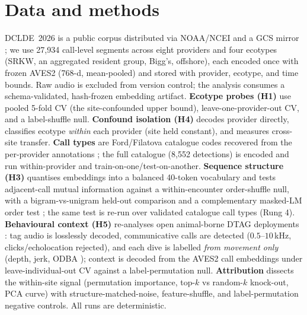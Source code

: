 \documentclass[11pt]{article}
\begin{document}
\section{Data and methods}
DCLDE~2026 is a public corpus distributed via NOAA/NCEI and a GCS mirror
\citep{palmer2025dclde,palmer2025dclde_data}; we use 27{,}934 call-level segments across
eight providers and four ecotypes (SRKW, an aggregated resident group, Bigg's, offshore),
each encoded once with frozen AVES2 (768-d, mean-pooled) and stored with provider, ecotype,
and time bounds. Raw audio is excluded from version control; the analysis consumes a
schema-validated, hash-frozen embedding artifact. \textbf{Ecotype probes (H1)} use pooled
5-fold CV (the site-confounded upper bound), leave-one-provider-out CV, and a label-shuffle
null. \textbf{Confound isolation (H4)} decodes provider directly, classifies ecotype
\emph{within} each provider (site held constant), and measures cross-site transfer.
\textbf{Call types} are Ford/Filatova catalogue codes recovered from the per-provider
annotations \citep{ford1989,filatova2015}; the full catalogue (8{,}552 detections) is
encoded and run within-provider and train-on-one/test-on-another. \textbf{Sequence
structure (H3)} quantises embeddings into a balanced 40-token vocabulary and tests
adjacent-call mutual information against a within-encounter order-shuffle null, with a
bigram-vs-unigram held-out comparison and a complementary masked-LM order test
\citep{vaswani2017attention,sharma2024}; the same test is re-run over validated catalogue
call types (Rung 4). \textbf{Behavioural context (H5)} re-analyses open animal-borne DTAG
deployments \citep{holt2024masking_data,tennessen2019}: tag audio is losslessly decoded,
communicative calls are detected ($0.5$--$10$\,kHz, clicks/echolocation rejected), and each
dive is labelled \emph{from movement only} (depth, jerk, ODBA \citep{wilson2006}); context
is decoded from the AVES2 call embeddings under leave-individual-out CV against a
label-permutation null. \textbf{Attribution} dissects the within-site signal (permutation
importance, top-$k$ vs random-$k$ knock-out, PCA curve) with structure-matched-noise,
feature-shuffle, and label-permutation negative controls. All runs are deterministic.

\vspace{-0.3em}
\end{document}
